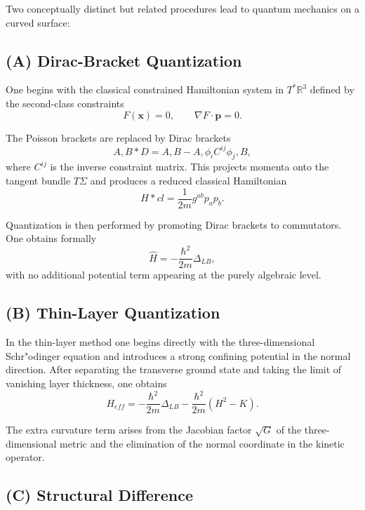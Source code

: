 \documentclass[11pt]{article}
\begin{document}
Two conceptually distinct but related procedures lead to quantum mechanics on a curved surface:

\subsection*{(A) Dirac-Bracket Quantization}

One begins with the classical constrained Hamiltonian system in $T^*\mathbb{R}^3$ defined by the second-class constraints
\begin{equation}
F(\mathbf{x}) = 0, \qquad \nabla F \cdot \mathbf{p} = 0.
\end{equation}

The Poisson brackets are replaced by Dirac brackets
\begin{equation}
{A,B}*D = {A,B} - {A,\phi_i}C^{ij}{\phi_j,B},
\end{equation}
where $C^{ij}$ is the inverse constraint matrix. This projects momenta onto the tangent bundle $T\Sigma$ and produces a reduced classical Hamiltonian
\begin{equation}
H*{cl} = \frac{1}{2m} g^{ab} p_a p_b.
\end{equation}

Quantization is then performed by promoting Dirac brackets to commutators. One obtains formally
\begin{equation}
\hat H = -\frac{\hbar^2}{2m}\Delta_{LB},
\end{equation}
with no additional potential term appearing at the purely algebraic level.

\subsection*{(B) Thin-Layer Quantization}

In the thin-layer method one begins directly with the three-dimensional Schr"odinger equation and introduces a strong confining potential in the normal direction. After separating the transverse ground state and taking the limit of vanishing layer thickness, one obtains
\begin{equation}
H_{eff} = -\frac{\hbar^2}{2m}\Delta_{LB} - \frac{\hbar^2}{2m}(H^2-K).
\end{equation}

The extra curvature term arises from the Jacobian factor $\sqrt{G}$ of the three-dimensional metric and the elimination of the normal coordinate in the kinetic operator.

\subsection*{(C) Structural Difference}
\end{document}
